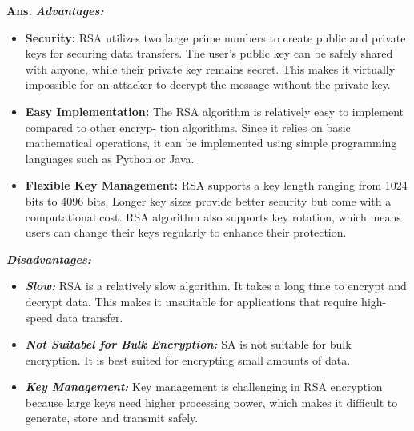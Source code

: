 \documentclass{article}
\begin{document}
\begin{enumerate}
	\textbf{Ans.} \textbf{\textit{Advantages:}}
	\begin{itemize}
		\item \textbf{Security:} RSA utilizes two large prime numbers to create public and private keys for securing data transfers. The user’s public key can be safely shared with anyone, while their private key remains secret. This makes it virtually impossible for an attacker to decrypt the message without the private key.
		\item \textbf{Easy Implementation:} The RSA algorithm is relatively easy to implement compared to other encryp- tion algorithms. Since it relies on basic mathematical operations, it can be implemented using simple programming languages such as Python or Java.
		\item \textbf{Flexible Key Management:} RSA supports a key length ranging from 1024 bits to 4096 bits. Longer key sizes provide better security but come with a computational cost. RSA algorithm also supports key rotation, which means users can change their keys regularly to enhance their protection.
	\end{itemize}
	\textbf{\textit{Disadvantages:}}
	\begin{itemize}
		\item \textbf{\textit{Slow:}}  RSA is a relatively slow algorithm. It takes a long time to encrypt and decrypt data. This makes
		it unsuitable for applications that require high-speed data transfer.
		\item \textbf{\textit{Not Suitabel for Bulk Encryption:}} SA is not suitable for bulk encryption. It is best suited for encrypting small amounts of data.
		\item \textbf{\textit{Key Management:}} Key management is challenging in RSA encryption because large keys need higher processing power, which makes it difficult to generate, store and transmit safely.
	\end{itemize}
\end{enumerate}
\end{document}
